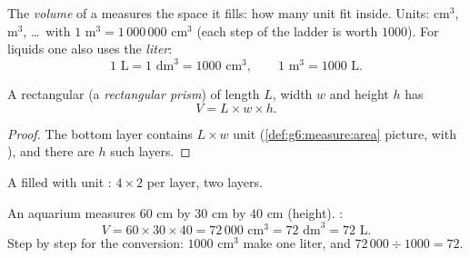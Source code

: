 \begin{definition}[Volume]\label{def:g6:measure:volume}
The \emph{volume} of a  measures the space it fills:
how many unit  fit inside. Units: cm$^3$, m$^3$, \dots\ with
$1$ m$^3 = 1\,000\,000$ cm$^3$ (each step of the ladder is worth
$1000$). For liquids one also uses the \emph{liter}:
\[
1 \text{ L} = 1 \text{ dm}^3 = 1000 \text{ cm}^3,
\qquad
1 \text{ m}^3 = 1000 \text{ L}.
\]
\end{definition}

\begin{proposition}\label{prop:g6:measure:box}
A rectangular  (a \emph{rectangular prism}) of length $L$, width $w$
and height $h$ has 
\[
V = L \times w \times h .
\]
\end{proposition}

\begin{proof}
The bottom layer contains $L \times w$ unit 
(\cref{def:g6:measure:area} picture, with ), and there are $h$
such layers.
\end{proof}

\begin{omfigure}

{\small A  filled with unit : $4 \times 2$  per layer, two
layers.}
\end{omfigure}

\begin{example}\label{ex:g6:measure:aquarium}
An aquarium measures $60$ cm by $30$ cm by $40$ cm (height). :
\[
V = 60 \times 30 \times 40 = 72\,000 \text{ cm}^3 = 72 \text{ dm}^3
= 72 \text{ L}.
\]
Step by step for the conversion: $1000$ cm$^3$ make one liter, and
$72\,000 \div 1000 = 72$.
\end{example}


